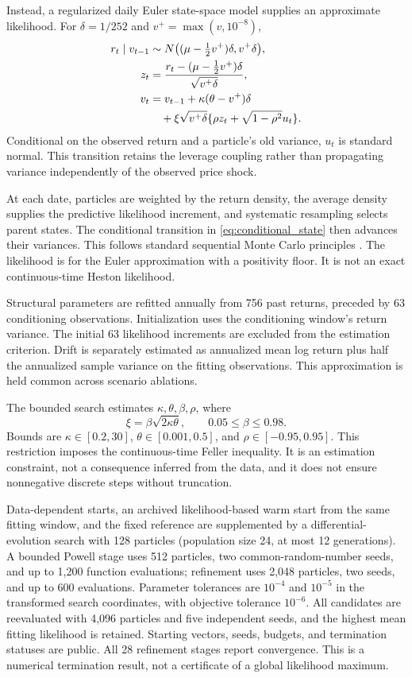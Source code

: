 Instead, a regularized daily Euler state-space model supplies an approximate likelihood. For $\delta=1/252$ and $v^+=\max(v,10^{-8})$,
\begin{align}
r_t\mid v_{t-1}&\sim N\bigl((\mu-\tfrac12v^+)\delta,v^+\delta\bigr),\\
z_t&=\frac{r_t-(\mu-\tfrac12v^+)\delta}{\sqrt{v^+\delta}},\\
v_t&=v_{t-1}+\kappa(\theta-v^+)\delta\notag\\
&\quad+\xi\sqrt{v^+\delta}\{\rho z_t+\sqrt{1-\rho^2}u_t\}.
\label{eq:conditional_state}
\end{align}
Conditional on the observed return and a particle's old variance, $u_t$ is standard normal. This transition retains the leverage coupling rather than propagating variance independently of the observed price shock.

At each date, particles are weighted by the return density, the average density supplies the predictive likelihood increment, and systematic resampling selects parent states. The conditional transition in \eqref{eq:conditional_state} then advances their variances. This follows standard sequential Monte Carlo principles \cite{arulampalam}. The likelihood is for the Euler approximation with a positivity floor. It is not an exact continuous-time Heston likelihood.

Structural parameters are refitted annually from 756 past returns, preceded by 63 conditioning observations. Initialization uses the conditioning window's return variance. The initial 63 likelihood increments are excluded from the estimation criterion. Drift is separately estimated as annualized mean log return plus half the annualized sample variance on the fitting observations. This approximation is held common across scenario ablations.

The bounded search estimates $\kappa,\theta,\beta,\rho$, where
\begin{equation}
\xi=\beta\sqrt{2\kappa\theta},\qquad 0.05\leq\beta\leq0.98.
\end{equation}
Bounds are $\kappa\in[0.2,30]$, $\theta\in[0.001,0.5]$, and $\rho\in[-0.95,0.95]$. This restriction imposes the continuous-time Feller inequality. It is an estimation constraint, not a consequence inferred from the data, and it does not ensure nonnegative discrete steps without truncation.

Data-dependent starts, an archived likelihood-based warm start from the same fitting window, and the fixed reference are supplemented by a differential-evolution search with 128 particles (population size 24, at most 12 generations). A bounded Powell stage uses 512 particles, two common-random-number seeds, and up to 1,200 function evaluations; refinement uses 2,048 particles, two seeds, and up to 600 evaluations. Parameter tolerances are $10^{-4}$ and $10^{-5}$ in the transformed search coordinates, with objective tolerance $10^{-6}$. All candidates are reevaluated with 4,096 particles and five independent seeds, and the highest mean fitting likelihood is retained. Starting vectors, seeds, budgets, and termination statuses are public. All 28 refinement stages report convergence. This is a numerical termination result, not a certificate of a global likelihood maximum.

